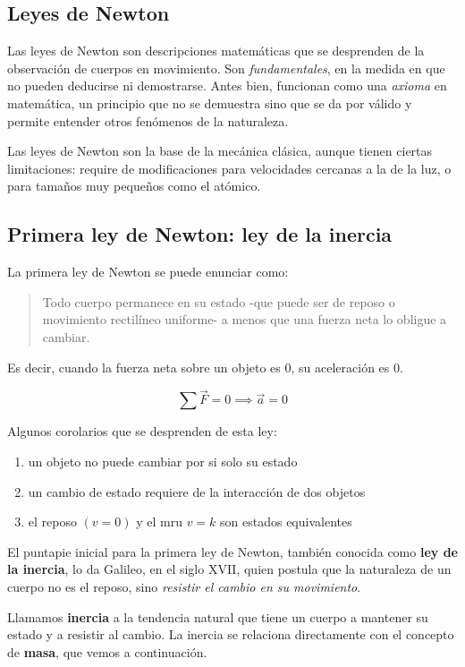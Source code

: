 \subsection{Leyes de Newton}

Las leyes de Newton son descripciones matemáticas que se desprenden de la 
observación de cuerpos en movimiento.
Son \textit{fundamentales}, en la medida en que no pueden deducirse ni 
demostrarse.
Antes bien,
funcionan como una \textit{axioma} en matemática,
un principio que no se demuestra sino que se da por válido y permite entender 
otros fenómenos de la naturaleza.

Las leyes de Newton son la base de la mecánica clásica,
aunque tienen ciertas limitaciones:
require de modificaciones para velocidades cercanas a la de la luz,
o para tamaños muy pequeños como el atómico.

\subsection{Primera ley de Newton: ley de la inercia}

La primera ley de Newton se puede enunciar como:

\blockquote{
    Todo cuerpo permanece en su estado 
    -que puede ser de reposo o movimiento rectilíneo uniforme- 
    a menos que una fuerza neta lo obligue a cambiar.}

Es decir, cuando la fuerza neta sobre un objeto es 0,
su aceleración es 0.

\begin{equation*}
    \sum \vec{F} = 0 \implies \vec{a} = 0
\end{equation*}

Algunos corolarios que se desprenden de esta ley:
\begin{enumerate}
    \item un objeto no puede cambiar por si solo su estado 
    \item un cambio de estado requiere de la interacción de dos objetos 
    \item el reposo \((v = 0)\) y el mru \(v = k\) son estados equivalentes 
\end{enumerate}

El puntapie inicial para la primera ley de Newton,
también conocida como \textbf{ley de la inercia},
lo da Galileo, en el siglo XVII,
quien postula que la naturaleza de un cuerpo no es el reposo,
sino \textit{resistir el cambio en su movimiento}.

Llamamos \textbf{inercia} a la tendencia natural que tiene un cuerpo a 
mantener su estado y a resistir al cambio.
La inercia se relaciona directamente con el concepto de \textbf{masa},
que vemos a continuación.

